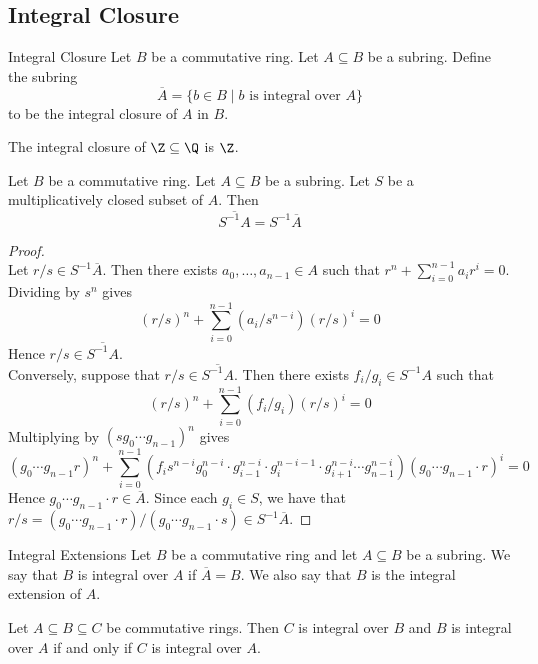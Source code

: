 \documentclass[a4paper]{article}
\begin{document}
\subsection{Integral Closure}
\begin{defn}{Integral Closure}{} Let $B$ be a commutative ring. Let $A\subseteq B$ be a subring. Define the subring $$\overline{A}=\{b\in B\;|\;b\text{ is integral over }A\}$$ to be the integral closure of $A$ in $B$. 
\end{defn}

\begin{eg}{}{} The integral closure of $\Z\subseteq\Q$ is $\Z$. 
\end{eg}

\begin{prp}{}{} Let $B$ be a commutative ring. Let $A\subseteq B$ be a subring. Let $S$ be a multiplicatively closed subset of $A$. Then $$\overline{S^{-1}A}=S^{-1}\overline{A}$$
\begin{proof}\\
Let $r/s\in S^{-1}\overline{A}$. Then there exists $a_0,\dots,a_{n-1}\in A$ such that $r^n+\sum_{i=0}^{n-1}a_ir^i=0$. Dividing by $s^n$ gives $$(r/s)^n+\sum_{i=0}^{n-1}(a_i/s^{n-i})(r/s)^i=0$$ Hence $r/s\in\overline{S^{-1}A}$. \\

Conversely, suppose that $r/s\in\overline{S^{-1}A}$. Then there exists $f_i/g_i\in S^{-1}A$ such that $$(r/s)^n+\sum_{i=0}^{n-1}(f_i/g_i)(r/s)^i=0$$ Multiplying by $(sg_0\cdots g_{n-1})^n$ gives $$(g_0\cdots g_{n-1}r)^n+\sum_{i=0}^{n-1}(f_is^{n-i}g_0^{n-i}\cdot g_{i-1}^{n-i}\cdot g_i^{n-i-1}\cdot g_{i+1}^{n-i}\cdots g_{n-1}^{n-i})(g_0\cdots g_{n-1}\cdot r)^i=0$$ Hence $g_0\cdots g_{n-1}\cdot r\in\overline{A}$. Since each $g_i\in S$, we have that $r/s=(g_0\cdots g_{n-1}\cdot r)/(g_0\cdots g_{n-1}\cdot s)\in S^{-1}\overline{A}$. 
\end{proof}
\end{prp}

\begin{defn}{Integral Extensions}{} Let $B$ be a commutative ring and let $A\subseteq B$ be a subring. We say that $B$ is integral over $A$ if $\overline{A}=B$. We also say that $B$ is the integral extension of $A$. 
\end{defn}

\begin{lmm}{}{} Let $A\subseteq B\subseteq C$ be commutative rings. Then $C$ is integral over $B$ and $B$ is integral over $A$ if and only if $C$ is integral over $A$. 
\end{lmm}
\end{document}
